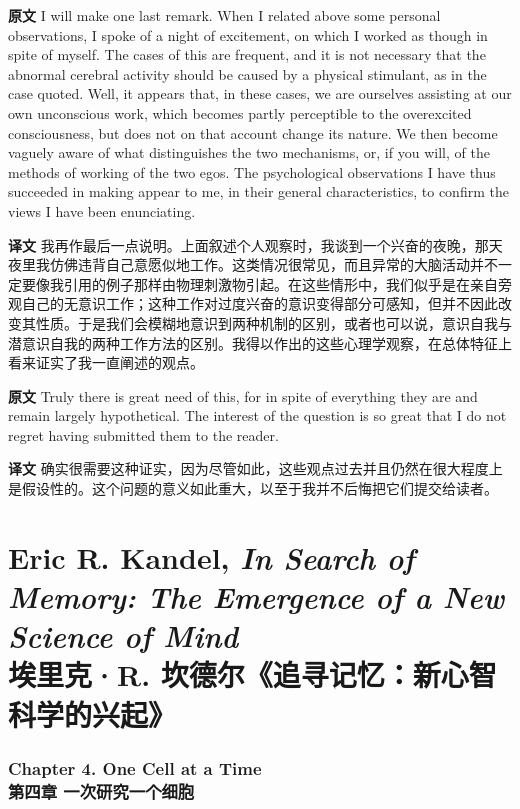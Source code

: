 \documentclass[UTF8]{ctexart}
\newenvironment{english}{\par\small\noindent\textbf{原文}\quad\ignorespaces}{\par}
\newenvironment{zhtranslation}{\par\noindent\textbf{译文}\quad\ignorespaces}{\par\vspace{0.35em}}
\begin{document}
\begin{english}
I will make one last remark. When I related above some personal observations, I spoke of a night of excitement, on which I worked as though in spite of myself. The cases of this are frequent, and it is not necessary that the abnormal cerebral activity should be caused by a physical stimulant, as in the case quoted. Well, it appears that, in these cases, we are ourselves assisting at our own unconscious work, which becomes partly perceptible to the overexcited consciousness, but does not on that account change its nature. We then become vaguely aware of what distinguishes the two mechanisms, or, if you will, of the methods of working of the two egos. The psychological observations I have thus succeeded in making appear to me, in their general characteristics, to confirm the views I have been enunciating.
\end{english}
\begin{zhtranslation}
我再作最后一点说明。上面叙述个人观察时，我谈到一个兴奋的夜晚，那天夜里我仿佛违背自己意愿似地工作。这类情况很常见，而且异常的大脑活动并不一定要像我引用的例子那样由物理刺激物引起。在这些情形中，我们似乎是在亲自旁观自己的无意识工作；这种工作对过度兴奋的意识变得部分可感知，但并不因此改变其性质。于是我们会模糊地意识到两种机制的区别，或者也可以说，意识自我与潜意识自我的两种工作方法的区别。我得以作出的这些心理学观察，在总体特征上看来证实了我一直阐述的观点。\end{zhtranslation}

\begin{english}
Truly there is great need of this, for in spite of everything they are and remain largely hypothetical. The interest of the question is so great that I do not regret having submitted them to the reader.
\end{english}
\begin{zhtranslation}
确实很需要这种证实，因为尽管如此，这些观点过去并且仍然在很大程度上是假设性的。这个问题的意义如此重大，以至于我并不后悔把它们提交给读者。\end{zhtranslation}

\part*{Eric R. Kandel, \emph{In Search of Memory: The Emergence of a New Science of Mind}\\埃里克·R. 坎德尔《追寻记忆：新心智科学的兴起》}

\section*{Chapter 4. One Cell at a Time\\第四章 一次研究一个细胞}
\end{document}
